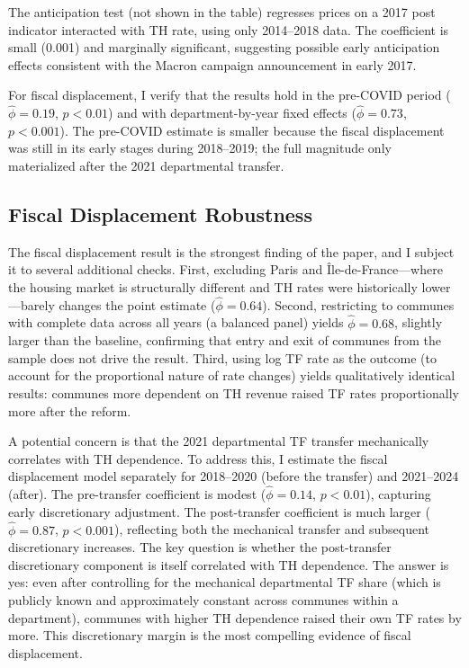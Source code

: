 \documentclass[12pt]{article}
\begin{document}


The anticipation test (not shown in the table) regresses prices on a 2017 post indicator interacted with TH rate, using only 2014--2018 data. The coefficient is small (0.001) and marginally significant, suggesting possible early anticipation effects consistent with the Macron campaign announcement in early 2017.

For fiscal displacement, I verify that the results hold in the pre-COVID period ($\hat\phi = 0.19$, $p < 0.01$) and with department-by-year fixed effects ($\hat\phi = 0.73$, $p < 0.001$). The pre-COVID estimate is smaller because the fiscal displacement was still in its early stages during 2018--2019; the full magnitude only materialized after the 2021 departmental transfer.

\subsection{Fiscal Displacement Robustness}

The fiscal displacement result is the strongest finding of the paper, and I subject it to several additional checks. First, excluding Paris and \^Ile-de-France---where the housing market is structurally different and TH rates were historically lower---barely changes the point estimate ($\hat\phi = 0.64$). Second, restricting to communes with complete data across all years (a balanced panel) yields $\hat\phi = 0.68$, slightly larger than the baseline, confirming that entry and exit of communes from the sample does not drive the result. Third, using log TF rate as the outcome (to account for the proportional nature of rate changes) yields qualitatively identical results: communes more dependent on TH revenue raised TF rates proportionally more after the reform.

A potential concern is that the 2021 departmental TF transfer mechanically correlates with TH dependence. To address this, I estimate the fiscal displacement model separately for 2018--2020 (before the transfer) and 2021--2024 (after). The pre-transfer coefficient is modest ($\hat\phi = 0.14$, $p < 0.01$), capturing early discretionary adjustment. The post-transfer coefficient is much larger ($\hat\phi = 0.87$, $p < 0.001$), reflecting both the mechanical transfer and subsequent discretionary increases. The key question is whether the post-transfer discretionary component is itself correlated with TH dependence. The answer is yes: even after controlling for the mechanical departmental TF share (which is publicly known and approximately constant across communes within a department), communes with higher TH dependence raised their own TF rates by more. This discretionary margin is the most compelling evidence of fiscal displacement.
\end{document}
